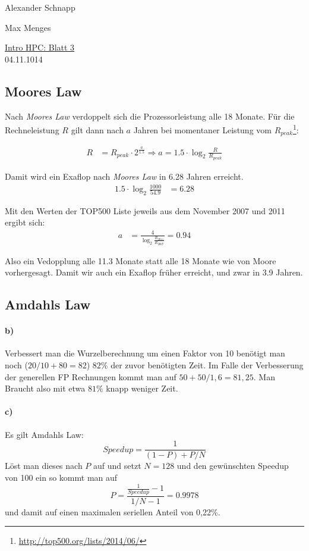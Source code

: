 \documentclass[a4paper,11pt]{scrartcl}
\begin{document}
\hfill Alexander Schnapp

\hfill Max Menges

\begin{center}
\underline{\Huge{Intro HPC: Blatt 3}}\\
\large{04.11.1014}\\
\end{center}


\subsection{Moores Law}
Nach \emph{Moores Law} verdoppelt sich die Prozessorleistung alle 18 Monate. Für die Rechneleistung $R$ gilt dann nach $a$ Jahren bei momentaner Leistung vom $R_{peak}$\footnote{\url{http://top500.org/lists/2014/06/}}:

\begin{align*}
R&=R_{peak}\cdot 2^{\frac{a}{1.5}} \Rightarrow a = 1.5\cdot \log_2{\frac{R}{R_{peak}}}
\end{align*}

Damit wird ein Exaflop nach \emph{Moores Law} in 6.28 Jahren erreicht.
\begin{align*}
1.5\cdot \log_2{\frac{1000}{54.9}}&=6.28
\end{align*}

Mit den Werten der TOP500 Liste jeweils aus dem November 2007 und 2011 ergibt sich:
\begin{align*}
    a&= \frac{4}{\log_2{\frac{R_{2011}}{R_{2007}}}}=0.94
\end{align*}

Also ein Vedopplung alle 11.3 Monate statt alle 18 Monate wie von Moore vorhergesagt. Damit wir auch ein Exaflop früher erreicht, und zwar in 3.9 Jahren.\\

\subsection{Amdahls Law}
\paragraph*{b)}Verbessert man die Wurzelberechnung um einen Faktor von 10 benötigt man noch ($20/10+80=82$) $82\%$ der zuvor benötigten Zeit. Im Falle der Verbesserung der generellen FP Rechnungen kommt man auf $50+50/1,6=81,25$. Man Braucht also mit etwa $81\%$ knapp weniger Zeit.
\paragraph*{c)}
Es gilt Amdahls Law:
\[
Speedup=\frac{1}{(1-P)+P/N}
\] 
Löst man dieses nach $P$ auf und setzt $N=128$ und den gewünschten Speedup von 100 ein so kommt man auf
\[
P=\frac{\frac{1}{Speedup}-1}{1/N-1}=0.9978
\]
und damit auf einen maximalen seriellen Anteil von 0,22\%.
\end{document}

